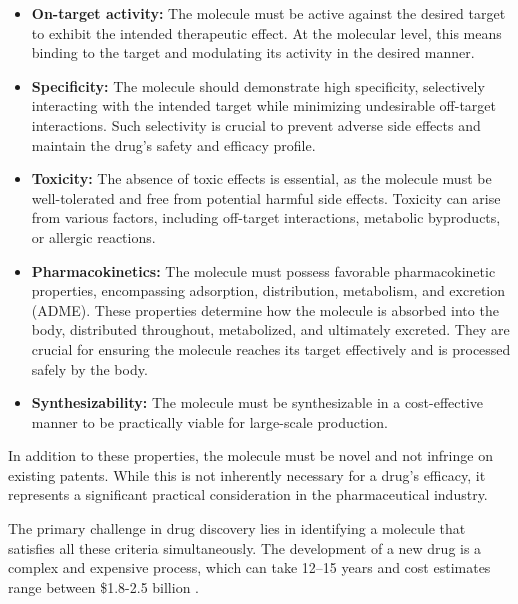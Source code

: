 \begin{itemize}
    \item \textbf{On-target activity:} The molecule must be active against the desired target to exhibit
          the intended therapeutic effect. At the molecular level, this means binding to the target and
          modulating its activity in the desired manner.

    \item \textbf{Specificity:} The molecule should demonstrate high specificity, selectively
          interacting with the intended target while minimizing undesirable off-target interactions. Such
          selectivity is crucial to prevent adverse side effects and maintain the drug's safety and efficacy
          profile.

    \item \textbf{Toxicity:} The absence of toxic effects is essential, as the molecule must be
          well-tolerated and free from potential harmful side effects. Toxicity can arise from various
          factors, including off-target interactions, metabolic byproducts, or allergic reactions.

    \item \textbf{Pharmacokinetics:} The molecule must possess favorable pharmacokinetic properties,
          encompassing adsorption, distribution, metabolism, and excretion (ADME). These properties determine
          how the molecule is absorbed into the body, distributed throughout, metabolized, and ultimately
          excreted. They are crucial for ensuring the molecule reaches its target effectively and is processed
          safely by the body.

    \item \textbf{Synthesizability:} The molecule must be synthesizable in a cost-effective manner to be
          practically viable for large-scale production.
\end{itemize}

In addition to these properties, the molecule must be novel and not infringe on existing patents.
While this is not inherently necessary for a drug's efficacy, it represents a significant practical
consideration in the pharmaceutical industry.

The primary challenge in drug discovery lies in identifying a molecule that satisfies all these
criteria simultaneously. The development of a new drug is a complex and expensive process, which can
take 12--15 years and cost estimates range between \$1.8-2.5 billion
\citep{paulHowImproveProductivity2010,dimasiInnovationPharmaceuticalIndustry2016}.

